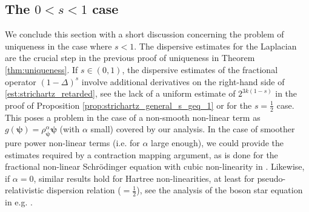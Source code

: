\documentclass[12pt,a4paper]{amsart}
\numberwithin{equation}{section}
\newcommand{\ulpsi}{\boldsymbol{\psi}}
\begin{document}
	\subsection{The \texorpdfstring{$ 0 < s < 1 $}{ s smaller than 1} case}
	We conclude this section with a short discussion concerning the problem of uniqueness in the case where $s < 1$. The dispersive estimates for the Laplacian are the crucial step in the previous proof of uniqueness in Theorem \ref{thm:uniqueness}. If $ s \in (0,1) $, the dispersive estimates of the fractional operator $ (1 - \Delta)^{s}$ involve additional derivatives on the right-hand side of \eqref{est:strichartz_retarded}, see the lack of a uniform estimate of $ 2^{3k(1-s)} $ in the proof of Proposition \ref{prop:strichartz_general_s_geq_1} or \cite[Appendix B]{breteaux2025propagation} for the $s=\frac12$ case. This poses a problem in the case of a non-smooth non-linear term as $ g(\ulpsi) = \rho_{\ulpsi}^\alpha \ulpsi $ (with $\alpha$ small) covered by our analysis. In the case of smoother pure power non-linear terms (i.e. for $\alpha$ large enough), we could provide the estimates required by a contraction mapping argument, as is done for the fractional non-linear Schr\"odinger equation with cubic non-linearity in \cite{guo2010global}. Likewise, if $\alpha=0$, similar results hold for Hartree non-linearities, at least for pseudo-relativistic dispersion relation ($=\frac12$), see the analysis of the boson star equation in e.g. \cite{breteaux2025propagation,breteaux2025exponentialdecayoutsidelight,lenzmann2007well}.
	
\end{document}
